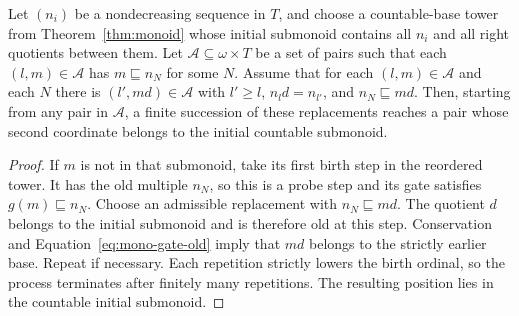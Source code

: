 \begin{lemma}\label{lem:mono-descent}
Let $(n_i)$ be a nondecreasing sequence in $T$, and choose a
countable-base tower from Theorem~\ref{thm:monoid} whose initial
submonoid contains all $n_i$ and all right quotients between them.
Let $\mathcal A\subseteq\omega\times T$ be a set of pairs such that
each $(l,m)\in\mathcal A$ has $m\sqsubseteq n_N$ for some $N$.
Assume that for each $(l,m)\in\mathcal A$ and each $N$ there is
$(l',md)\in\mathcal A$ with $l'\geq l$, $n_ld=n_{l'}$, and
$n_N\sqsubseteq md$.  Then, starting from any pair in $\mathcal A$,
a finite succession of these replacements reaches a pair whose second
coordinate belongs to the initial countable submonoid.
\end{lemma}
\begin{proof}
If $m$ is not in that submonoid, take its first birth step in the
reordered tower.  It has the old multiple $n_N$, so this is a probe
step and its gate satisfies $g(m)\sqsubseteq n_N$.  Choose an
admissible replacement with $n_N\sqsubseteq md$.  The quotient
$d$ belongs to the initial submonoid and is therefore old at this
step.  Conservation and Equation~\eqref{eq:mono-gate-old} imply
that $md$ belongs to the strictly earlier base.  Repeat if necessary.
Each repetition strictly lowers the birth ordinal, so the process
terminates after finitely many repetitions.  The resulting position
lies in the countable initial submonoid.
\end{proof}
